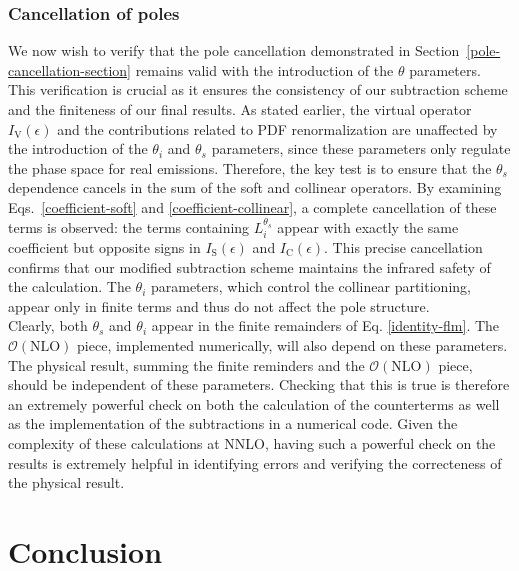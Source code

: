 \documentclass[a4paper, 12pt]{book}
\begin{document}
\subsection{Cancellation of poles}
We now wish to verify that the pole cancellation demonstrated in Section~\ref{pole-cancellation-section} remains valid with the introduction of the $\theta$ parameters. This verification is crucial as it ensures the consistency of our subtraction scheme and the finiteness of our final results. As stated earlier, the virtual operator $I_{\mathrm{V}}(\epsilon)$ and the contributions related to PDF renormalization are unaffected by the introduction of the $\theta_i$ and $\theta_s$ parameters, since these parameters only regulate the phase space for real emissions. Therefore, the key test is to ensure that the $\theta_s$ dependence cancels in the sum of the soft and collinear operators. By examining Eqs.~\ref{coefficient-soft} and \ref{coefficient-collinear}, a complete cancellation of these terms is observed: the terms containing $L_i^{\theta_s}$ appear with exactly the same coefficient but opposite signs in $I_{\mathrm{S}}(\epsilon)$ and $I_{\mathrm{C}}(\epsilon)$. This precise cancellation confirms that our modified subtraction scheme maintains the infrared safety of the calculation. 
The $\theta_i$ parameters, which control the collinear partitioning, appear only in finite terms and thus do not affect the pole structure.\\
Clearly, both $\theta_s$ and $\theta_i$ appear in the finite remainders of Eq. \ref{identity-flm}. The $\mathcal{O}(\mathrm{NLO})$ piece, implemented numerically, will also depend on these parameters. The physical result, summing the finite reminders and the $\mathcal{O}(\mathrm{NLO})$ piece, should be independent of these parameters. Checking that this is true is therefore an extremely powerful check on both the calculation of the counterterms as well as the implementation of the subtractions in a numerical code. Given the complexity of these calculations at NNLO, having such a powerful check on the results is extremely helpful in identifying errors and verifying the correcteness of the physical result.





\clearpage

\chapter{Conclusion}
\end{document}
